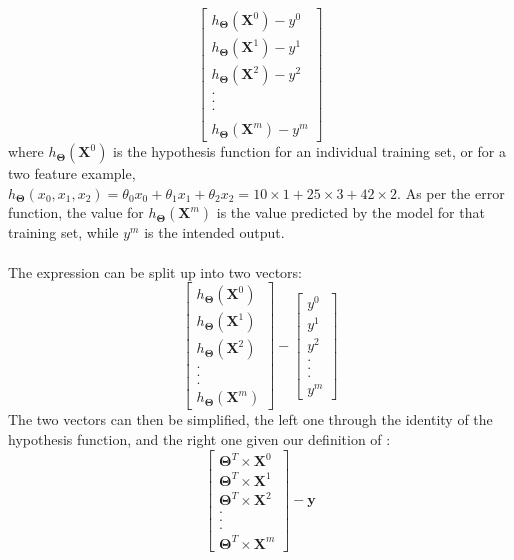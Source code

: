 \documentclass[a4paper,12pt]{article}
\begin{document}
\[\begin{bmatrix} h_{\boldsymbol{\Theta}} (\boldsymbol{X}^0) - y^0 \\ h_{\boldsymbol{\Theta}} (\boldsymbol{X}^1) - y^1 \\ h_{\boldsymbol{\Theta}} (\boldsymbol{X}^2) - y^2 \\ . \\ . \\ . \\  \\ h_{\boldsymbol{\Theta}} (\boldsymbol{X}^m) - y^m\end{bmatrix}\]
where $h_{\boldsymbol{\Theta}} (\boldsymbol{X}^0)$ is the hypothesis function for an individual training set, or for a two feature example, $h_{\boldsymbol{\Theta}} (x_0, x_1, x_2) = \theta_0x_0 + \theta_1x_1 + \theta_2x_2 = 10\times 1 + 25 \times 3 + 42 \times 2$. As per the error function, the value for $h_{\boldsymbol{\Theta}} (\boldsymbol{X}^m)$ is the value predicted by the model for that training set, while $y^m$ is the intended output.
\\
\\
The expression can be split up into two vectors: 
\[\begin{bmatrix} h_{\boldsymbol{\Theta}} (\boldsymbol{X}^0) \\ h_{\boldsymbol{\Theta}} (\boldsymbol{X}^1) \\ h_{\boldsymbol{\Theta}} (\boldsymbol{X}^2) \\ . \\ . \\ . \\ h_{\boldsymbol{\Theta}} (\boldsymbol{X}^m) \end{bmatrix} - \begin{bmatrix} y^0 \\ y^1 \\ y^2 \\ . \\ . \\ . \\ y^m \end{bmatrix}\]
The two vectors can then be simplified, the left one through the identity of the hypothesis function, and the right one given our definition of \unboldmath:
\[\begin{bmatrix} \boldsymbol{\Theta}^T \times \boldsymbol{X}^0 \\ \boldsymbol{\Theta}^T \times \boldsymbol{X}^1 \\ \boldsymbol{\Theta}^T \times \boldsymbol{X}^2 \\ . \\ . \\ . \\ \boldsymbol{\Theta}^T \times \boldsymbol{X}^m \end{bmatrix} - \boldsymbol{y}\]
\end{document}
